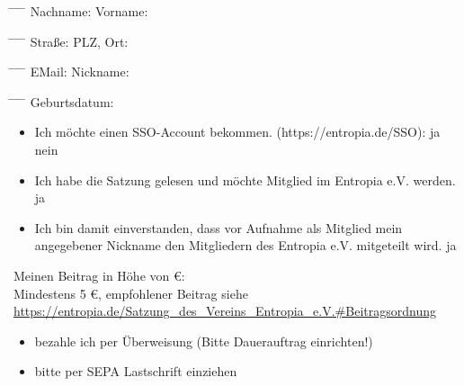 \documentclass{scrartcl}
\begin{document}
\begin{tabbing}
\hspace*{3cm}\= \hspace*{6cm} \= \hspace*{2cm} \= \hspace*{4cm} \= \kill
Nachname: \> \underline{\hspace{150pt}} \> Vorname: \>  \underline{\hspace{150pt}}
\end{tabbing}
\begin{tabbing}
\hspace*{3cm}\= \hspace*{6cm} \= \hspace*{2cm} \= \hspace*{4cm} \= \kill
Stra{\ss}e: \> \underline{\hspace{150pt}} \> PLZ, Ort: \> \underline{\hspace{150pt}}
\end{tabbing}
\begin{tabbing}
\hspace*{3cm}\= \hspace*{6cm} \= \hspace*{2cm} \= \hspace*{4cm} \= \kill
EMail: \> \underline{\hspace{150pt}} \> Nickname: \> \underline{\hspace{150pt}}
\end{tabbing}
\begin{tabbing}
\hspace*{3cm}\= \hspace*{6cm} \= \hspace*{2cm} \= \hspace*{4cm} \= \kill
Geburtsdatum: \> \underline{\hspace{150pt}} \>
\end{tabbing}
\begin{itemize}
\item[] Ich möchte einen SSO-Account bekommen. (https://entropia.de/SSO): \Square ja \Square nein
\item[] Ich habe die Satzung gelesen und m\"ochte Mitglied im Entropia e.V. werden.  \Square ja
\item[] Ich bin damit einverstanden, dass vor Aufnahme als Mitglied mein angegebener Nickname den Mitgliedern des Entropia e.V. mitgeteilt wird.  \Square ja
\end{itemize}
Meinen Beitrag in Höhe von \underline{\hspace{30pt}} €:\\
{\tiny Mindestens 5 €, empfohlener Beitrag siehe \url{https://entropia.de/Satzung_des_Vereins_Entropia_e.V.#Beitragsordnung}}
\begin{itemize}
\item[\Square] bezahle ich per \"Uberweisung (Bitte Dauerauftrag einrichten!)
\item[\Square] bitte per SEPA Lastschrift einziehen
\end{itemize}
\addvspace{0.4cm}
\end{document}
